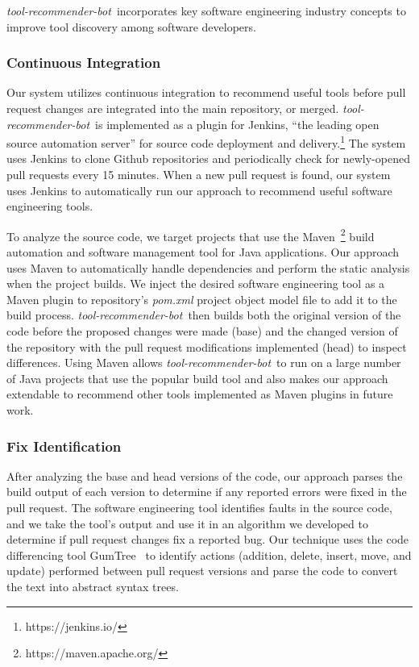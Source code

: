 \documentclass[sigconf,review,anonymous]{acmart}
\newcommand{\tool}{\textsl{tool-recommender-bot}}
\begin{document}
\tool~incorporates key software engineering industry concepts to improve tool discovery among software developers.

\subsubsection{Continuous Integration}

Our system utilizes continuous integration to recommend useful tools before pull request changes are integrated into the main repository, or merged. \tool~is implemented as a plugin for Jenkins, ``the leading open source automation server'' for source code deployment and delivery.\footnote{https://jenkins.io/} The system uses Jenkins to clone Github repositories and periodically check for newly-opened pull requests every 15 minutes. When a new pull request is found, our system uses Jenkins to automatically run our approach to recommend useful software engineering tools.

To analyze the source code, we target projects that use the Maven~\footnote{https://maven.apache.org/} build automation and software management tool for Java applications. Our approach uses Maven to automatically handle dependencies and perform the static analysis when the project builds. We inject the desired software engineering tool as a Maven plugin to repository's \textit{pom.xml} project object model file to add it to the build process. \tool~then builds both the original version of the code before the proposed changes were made (base) and the changed version of the repository with the pull request modifications implemented (head) to inspect differences. Using Maven allows \tool~to run on a large number of Java projects that use the popular build tool and also makes our approach extendable to recommend other tools implemented as Maven plugins in future work. 

\subsubsection{Fix Identification}

After analyzing the base and head versions of the code, our approach parses the build output of each version to determine if any reported errors were fixed in the pull request. The software engineering tool identifies faults in the source code, and we take the tool's output and use it in an algorithm we developed to determine if pull request changes fix a reported bug. Our technique uses the code differencing tool GumTree~\cite{GumTree} to identify actions (addition, delete, insert, move, and update) performed between pull request versions and parse the code to convert the text into abstract syntax trees. 
\end{document}

